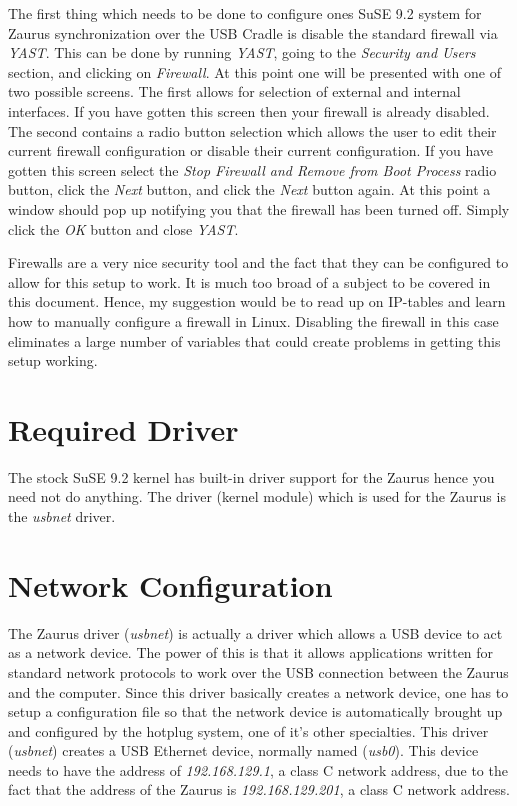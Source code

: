 \documentclass{article}
\begin{document}
The first thing which needs to be done to configure ones SuSE 9.2 system for
Zaurus synchronization over the USB Cradle is disable the standard firewall
via \emph{YAST}. This can be done by running \emph{YAST}, going to the
\emph{Security and Users} section, and clicking on \emph{Firewall}. At this
point one will be presented with one of two possible screens. The first allows
for selection of external and internal interfaces. If you have
gotten this screen then your firewall is already disabled. The second contains
a radio button selection which allows the user to edit their
current firewall configuration or disable their current configuration. If you
have gotten this screen select the \emph{Stop Firewall and Remove from Boot
  Process} radio button, click the \emph{Next} button, and click the
\emph{Next} button again. At this point a window should pop up notifying you
that the firewall has been turned off. Simply click the \emph{OK} button and
close \emph{YAST}.

Firewalls are a very nice security tool and the fact that they
can be configured to allow for this setup to work. It is much too broad of a
subject to be covered in this document. Hence, my suggestion would be to read
up on IP-tables and learn how to manually configure a firewall in
Linux. Disabling the firewall in this case eliminates a large number of
variables that could create problems in getting this setup working.

\section{Required Driver}

The stock SuSE 9.2 kernel has built-in driver support for
the Zaurus hence you need not do anything.  The driver (kernel module) which
is used for the Zaurus is the \emph{usbnet} driver.

\section{Network Configuration}

The Zaurus driver (\emph{usbnet}) is actually a driver which allows
a USB device to act as a network device. The power of this is that it allows
applications written for standard network protocols to work over the USB
connection between the Zaurus and the computer. Since this driver basically
creates a network device, one has to setup a configuration file so that the
network device is automatically brought up and configured by the hotplug
system, one of it's other specialties.  This driver (\emph{usbnet}) creates a
USB Ethernet device, normally named (\emph{usb0}).  This device needs to
have the address of \emph{192.168.129.1}, a class C network address, due to
the fact that the address of the Zaurus is \emph{192.168.129.201}, a
class C network address.
\end{document}
